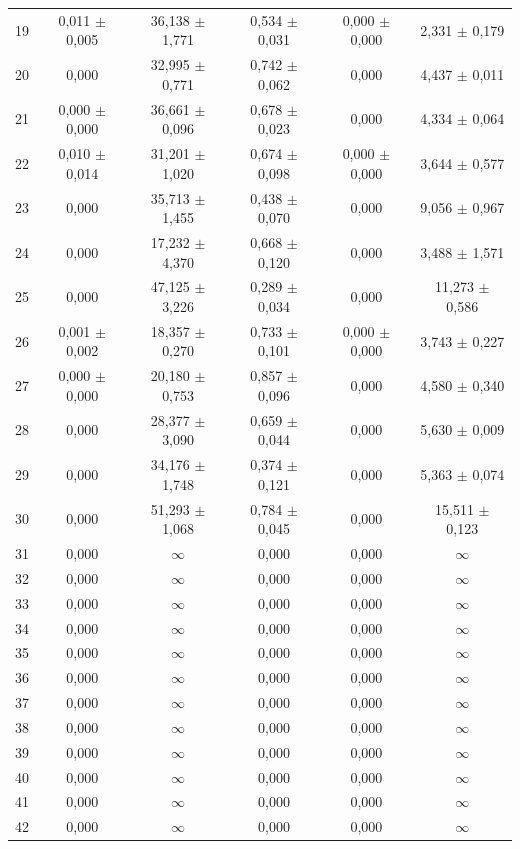 \begin{tabular}{l c c c c c}
19 & 0,011 $\pm$ 0,005 & 36,138 $\pm$ 1,771 & 0,534 $\pm$ 0,031 & 0,000 $\pm$ 0,000 & 2,331 $\pm$ 0,179 \\
20 & 0,000 & 32,995 $\pm$ 0,771 & 0,742 $\pm$ 0,062 & 0,000 & 4,437 $\pm$ 0,011 \\
21 & 0,000 $\pm$ 0,000 & 36,661 $\pm$ 0,096 & 0,678 $\pm$ 0,023 & 0,000 & 4,334 $\pm$ 0,064 \\
22 & 0,010 $\pm$ 0,014 & 31,201 $\pm$ 1,020 & 0,674 $\pm$ 0,098 & 0,000 $\pm$ 0,000 & 3,644 $\pm$ 0,577 \\
23 & 0,000 & 35,713 $\pm$ 1,455 & 0,438 $\pm$ 0,070 & 0,000 & 9,056 $\pm$ 0,967 \\
24 & 0,000 & 17,232 $\pm$ 4,370 & 0,668 $\pm$ 0,120 & 0,000 & 3,488 $\pm$ 1,571 \\
25 & 0,000 & 47,125 $\pm$ 3,226 & 0,289 $\pm$ 0,034 & 0,000 & 11,273 $\pm$ 0,586 \\
26 & 0,001 $\pm$ 0,002 & 18,357 $\pm$ 0,270 & 0,733 $\pm$ 0,101 & 0,000 $\pm$ 0,000 & 3,743 $\pm$ 0,227 \\
27 & 0,000 $\pm$ 0,000 & 20,180 $\pm$ 0,753 & 0,857 $\pm$ 0,096 & 0,000 & 4,580 $\pm$ 0,340 \\
28 & 0,000 & 28,377 $\pm$ 3,090 & 0,659 $\pm$ 0,044 & 0,000 & 5,630 $\pm$ 0,009 \\
29 & 0,000 & 34,176 $\pm$ 1,748 & 0,374 $\pm$ 0,121 & 0,000 & 5,363 $\pm$ 0,074 \\
30 & 0,000 & 51,293 $\pm$ 1,068 & 0,784 $\pm$ 0,045 & 0,000 & 15,511 $\pm$ 0,123 \\
31 & 0,000 & $\infty$ & 0,000 & 0,000 & $\infty$ \\
32 & 0,000 & $\infty$ & 0,000 & 0,000 & $\infty$ \\
33 & 0,000 & $\infty$ & 0,000 & 0,000 & $\infty$ \\
34 & 0,000 & $\infty$ & 0,000 & 0,000 & $\infty$ \\
35 & 0,000 & $\infty$ & 0,000 & 0,000 & $\infty$ \\
36 & 0,000 & $\infty$ & 0,000 & 0,000 & $\infty$ \\
37 & 0,000 & $\infty$ & 0,000 & 0,000 & $\infty$ \\
38 & 0,000 & $\infty$ & 0,000 & 0,000 & $\infty$ \\
39 & 0,000 & $\infty$ & 0,000 & 0,000 & $\infty$ \\
40 & 0,000 & $\infty$ & 0,000 & 0,000 & $\infty$ \\
41 & 0,000 & $\infty$ & 0,000 & 0,000 & $\infty$ \\
42 & 0,000 & $\infty$ & 0,000 & 0,000 & $\infty$ \\

\end{tabular}

